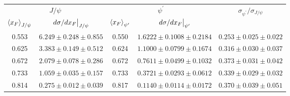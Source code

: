 \begin{tabular}{cc|cc|c}
\hline
\multicolumn{2}{c|}{$J/\psi$} &
  \multicolumn{2}{c|}{$\psi^{\prime}$} &
  \multirow{2}{*}{$\sigma_{\psi^\prime}/\sigma_{J/\psi}$} \\ \cline{1-4}
$\expval{x_F}_{J/\psi}$ &
  $\eval{d\sigma/dx_F}_{J/\psi}$ &
  $\expval{x_F}_{\psi^\prime}$ &
  $\eval{d\sigma/dx_F}_{\psi^\prime}$ &
   \\ \hline
0.553 & $6.249\pm0.248\pm0.855$ & 0.550 & $1.6222\pm0.1008\pm0.2184$ & $0.253\pm0.025\pm0.022$ \\
0.625 & $3.383\pm0.149\pm0.512$ & 0.624 & $1.1000\pm0.0799\pm0.1674$ & $0.316\pm0.030\pm0.037$ \\
0.672 & $2.079\pm0.078\pm0.286$ & 0.672 & $0.7611\pm0.0499\pm0.1032$ & $0.373\pm0.031\pm0.042$ \\
0.733 & $1.059\pm0.035\pm0.157$ & 0.733 & $0.3721\pm0.0293\pm0.0612$ & $0.339\pm0.029\pm0.032$ \\
0.814 & $0.275\pm0.012\pm0.039$ & 0.817 & $0.1140\pm0.0114\pm0.0172$ & $0.370\pm0.039\pm0.051$ \\ \hline
\end{tabular}
